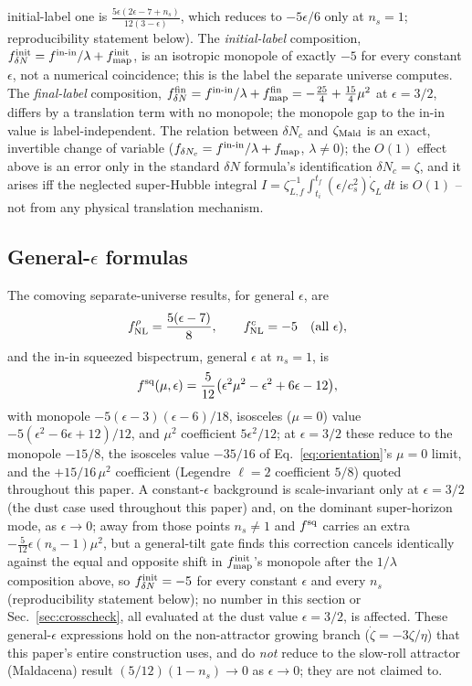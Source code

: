 \documentclass[aps,prd,twocolumn,superscriptaddress,nofootinbib,longbibliography]{revtex4-2}
\begin{document}
initial-label one is $\frac{5\epsilon(2\epsilon-7+n_s)}{12(3-\epsilon)}$,
which reduces to $-5\epsilon/6$ only at $n_s=1$; reproducibility statement
below). The \emph{initial-label} composition,
$f_{\delta N}^{\rm init}=f^{\rm in\text{-}in}/\lambda+f_{\rm map}^{\rm
init}$, is an isotropic monopole of exactly $-5$ for every constant
$\epsilon$, not a numerical coincidence; this is the label the separate
universe computes. The \emph{final-label} composition,
$f_{\delta N}^{\rm fin}=f^{\rm in\text{-}in}/\lambda+f_{\rm map}^{\rm
fin}=-\tfrac{25}{4}+\tfrac{15}{4}\mu^2$ at $\epsilon=3/2$, differs by a
translation term with no monopole; the monopole gap to the in-in value is
label-independent.
The relation between $\delta N_c$ and $\zeta_{\rm Mald}$ is an exact,
invertible change of variable ($f_{\delta N_c}=f^{\rm in\text{-}in}/\lambda
+f_{\rm map}$, $\lambda\neq0$); the $O(1)$ effect above is an error only
in the standard $\delta N$ formula's identification $\delta N_c=\zeta$,
and it arises iff the neglected super-Hubble integral
$I=\zeta_{L,f}^{-1}\int_{t_i}^{t_f}(\epsilon/c_s^2)\dot\zeta_L\,dt$ is
$O(1)$ -- not from any physical translation mechanism.

\subsection{General-$\epsilon$ formulas}

The comoving separate-universe results, for general $\epsilon$, are
\begin{equation}
f_{\rm NL}^\rho=\frac{5(\epsilon-7)}{8},\qquad f_{\rm NL}^c=-5\quad(\text{all }\epsilon),
\end{equation}
and the in-in squeezed bispectrum, general $\epsilon$ at $n_s=1$, is
\begin{equation}
f^{\rm sq}(\mu,\epsilon)=\frac{5}{12}\big(\epsilon^2\mu^2-\epsilon^2+6\epsilon-12\big),
\end{equation}
with monopole $-5(\epsilon-3)(\epsilon-6)/18$, isosceles ($\mu=0$) value
$-5(\epsilon^2-6\epsilon+12)/12$, and $\mu^2$ coefficient $5\epsilon^2/12$;
at $\epsilon=3/2$ these reduce to the monopole $-15/8$, the isosceles value
$-35/16$ of Eq.~\eqref{eq:orientation}'s $\mu=0$ limit, and the
$+15/16\,\mu^2$ coefficient (Legendre $\ell=2$ coefficient $5/8$) quoted
throughout this paper. A constant-$\epsilon$ background is scale-invariant
only at $\epsilon=3/2$ (the dust case used throughout this paper) and,
on the dominant super-horizon mode, as $\epsilon\to0$; away from those
points $n_s\neq1$ and $f^{\rm sq}$ carries an extra
$-\tfrac{5}{12}\epsilon(n_s-1)\mu^2$, but a general-tilt gate finds this
correction cancels identically against the equal and opposite shift in
$f_{\rm map}^{\rm init}$'s monopole after the $1/\lambda$ composition
above, so $f_{\delta N}^{\rm init}=-5$ for every constant $\epsilon$ and
every $n_s$ (reproducibility statement below); no number in this section
or Sec.~\ref{sec:crosscheck}, all evaluated at the dust value
$\epsilon=3/2$, is affected. These general-$\epsilon$ expressions hold on
the non-attractor growing branch ($\dot\zeta=-3\zeta/\eta$) that this
paper's entire construction uses, and do \emph{not} reduce to the
slow-roll attractor (Maldacena) result $(5/12)(1-n_s)\to0$ as
$\epsilon\to0$; they are not claimed to.
\end{document}

